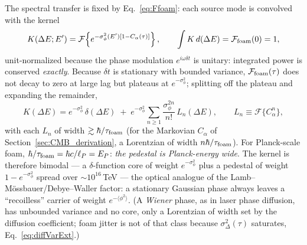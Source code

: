 \documentclass[aps,prd,onecolumn,amsmath,amssymb]{revtex4-2}
\begin{document}
The spectral transfer is fixed by Eq.~\eqref{eq:Ffoam}: each source
mode is convolved with the kernel
\begin{equation}
  K(\Delta E;E')
    = \mathcal{F}\!\left\{e^{-\sigma_\phi^2(E')[1-C_\alpha(\tau)]}\right\},
  \qquad
  \int K\,d(\Delta E) = \mathcal{F}_{\rm foam}(0)=1,
  \label{eq:tevline_K}
\end{equation}
unit-normalized because the phase modulation $e^{i\omega\delta t}$ is
unitary: integrated power is conserved \emph{exactly}.  Because
$\delta t$ is stationary with bounded variance,
$\mathcal{F}_{\rm foam}(\tau)$ does not decay to zero at large lag but
plateaus at $e^{-\sigma_\phi^2}$; splitting off the plateau and
expanding the remainder,
\begin{equation}
  K(\Delta E) = e^{-\sigma_\phi^2}\,\delta(\Delta E)
  \;+\; e^{-\sigma_\phi^2}\sum_{n\ge1}\frac{\sigma_\phi^{2n}}{n!}\,
  L_n(\Delta E),
  \qquad L_n \equiv \mathcal{F}\{C_\alpha^n\},
  \label{eq:tevline_Ksplit}
\end{equation}
with each $L_n$ of width $\gtrsim\hbar/\tau_{\rm foam}$ (for the
Markovian $C_\alpha$ of Section~\ref{sec:CMB_derivation}, a Lorentzian
of width $n\hbar/\tau_{\rm foam}$).  For Planck-scale foam,
$\hbar/\tau_{\rm foam}=\hbar c/\ell_P=E_P$: \emph{the pedestal is
Planck-energy wide}.  The kernel is therefore bimodal --- a
$\delta$-function core of weight $e^{-\sigma_\phi^2}$ plus a pedestal
of weight $1-e^{-\sigma_\phi^2}$ spread over $\sim10^{16}$\,TeV ---
the optical analogue of the Lamb--M\"ossbauer/Debye--Waller factor: a
stationary Gaussian phase always leaves a ``recoilless'' carrier of
weight $e^{-\langle\phi^2\rangle}$.  (A \emph{Wiener} phase, as in
laser phase diffusion, has unbounded variance and no core, only a
Lorentzian of width set by the diffusion coefficient; foam jitter is
not of that class because $\sigma_\Delta^2(\tau)$ saturates,
Eq.~\eqref{eq:diffVarExt}.)
\end{document}
